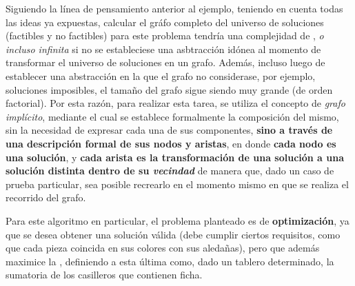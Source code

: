 \documentclass[11pt, a4paper, twoside]{article}
\begin{document}

Siguiendo la línea de pensamiento anterior al ejemplo, teniendo en cuenta todas
las ideas ya expuestas, calcular el gráfo completo del universo de soluciones
(factibles y no factibles) para este problema tendría una complejidad de
, \emph{o incluso infinita} si no se estableciese una asbtracción
idónea al momento de transformar el universo de soluciones en un grafo. Además,
incluso luego de establecer una abstracción en la que el grafo no considerase,
por ejemplo, soluciones imposibles, el tamaño del grafo sigue siendo muy grande
(de orden factorial). Por esta razón, para realizar esta tarea, se utiliza el
concepto de \emph{grafo implícito}, mediante el cual se establece formalmente la
composición del mismo, sin la necesidad de expresar cada una de sus componentes,
\textbf{sino a través de una descripción formal de sus nodos y aristas}, en
donde \textbf{cada nodo es una solución}, y \textbf{cada arista es la
transformación de una solución a una solución distinta dentro de su
\emph{vecindad}} de manera que, dado un caso de prueba particular, sea posible
recrearlo en el momento mismo en que se realiza el recorrido del grafo.

Para este algoritmo en particular, el problema planteado es de
\textbf{optimización}, ya que se desea obtener una solución válida (debe cumplir
ciertos requisitos, como que cada pieza coincida en sus colores con sus
aledañas), pero que además maximice la ,
definiendo a esta última como, dado un tablero determinado, la sumatoria de los
casilleros que contienen ficha.






\end{document}
